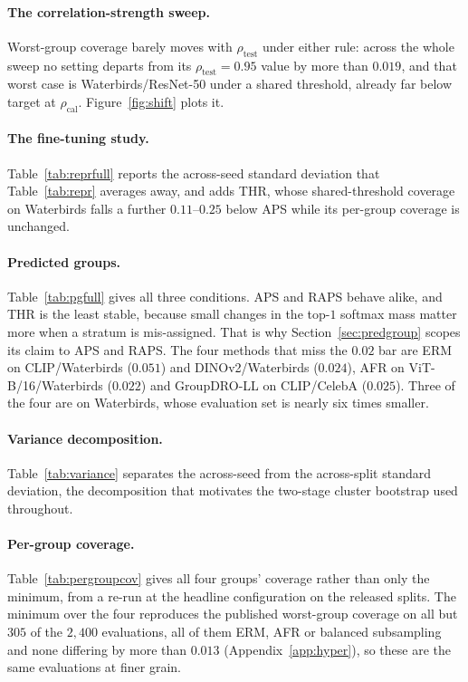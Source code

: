 \documentclass[pdflatex,sn-basic]{sn-jnl}%
\theoremstyle{thmstyleone}%
\newcommand{\rhocal}{\rho_{\mathrm{cal}}}
\newcommand{\rhotest}{\rho_{\mathrm{test}}}
\begin{document}
\begin{appendices}
\paragraph{The correlation-strength sweep.} Worst-group coverage barely moves with $\rhotest$ under
either rule: across the whole sweep no setting departs from its $\rhotest=0.95$ value by more than
$0.019$, and that worst case is Waterbirds/ResNet-50 under a shared threshold, already far below
target at $\rhocal$. Figure~\ref{fig:shift} plots it.

\paragraph{The fine-tuning study.} Table~\ref{tab:reprfull} reports the across-seed standard
deviation that Table~\ref{tab:repr} averages away, and adds THR, whose shared-threshold coverage on
Waterbirds falls a further $0.11$--$0.25$ below APS while its per-group coverage is unchanged.

\paragraph{Predicted groups.} Table~\ref{tab:pgfull} gives all three conditions. APS and RAPS
behave alike, and THR is the least stable, because small changes in the top-$1$ softmax mass matter
more when a stratum is mis-assigned. That is why Section~\ref{sec:predgroup} scopes its claim to
APS and RAPS. The four methods that miss the $0.02$ bar are ERM on CLIP/Waterbirds ($0.051$) and
DINOv2/Waterbirds ($0.024$), AFR on ViT-B/16/Waterbirds ($0.022$) and GroupDRO-LL on CLIP/CelebA
($0.025$). Three of the four are on Waterbirds, whose evaluation set is nearly six times smaller.

\paragraph{Variance decomposition.} Table~\ref{tab:variance} separates the across-seed
from the across-split standard deviation, the decomposition that motivates the
two-stage cluster bootstrap used throughout.

\paragraph{Per-group coverage.} Table~\ref{tab:pergroupcov} gives all four groups'
coverage rather than only the minimum, from a re-run at the headline configuration on the released
splits. The minimum over the four reproduces the published worst-group coverage on all but $305$ of
the $2{,}400$ evaluations, all of them ERM, AFR or balanced subsampling and none differing by more
than $0.013$ (Appendix~\ref{app:hyper}), so these are the same evaluations at finer grain.


\end{appendices}
\end{document}
